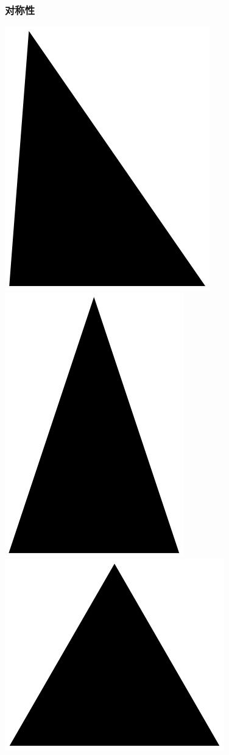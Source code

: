 \documentclass[CJK]{beamer}
\begin{document}
\begin{frame}
\frametitle{\bch 对称性 \ech}
\bch

\begin{center}
\includegraphics[scale=0.2]{tri}
\includegraphics[scale=0.2]{etri}
\includegraphics[scale=0.2]{rtri}
\end{center}

\ech
\end{frame}
\end{document}
